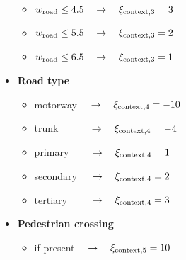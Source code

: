 \begin{itemize}
\begin{itemize}
                        \item $w_{\rm{road}}\leq4.5\quad\to\quad\xi_{\rm{context,3}}=3$
                        \item $w_{\rm{road}}\leq5.5\quad\to\quad\xi_{\rm{context,3}}=2$
                        \item $w_{\rm{road}}\leq6.5\quad\to\quad\xi_{\rm{context,3}}=1$
                    \end{itemize}
                \item \textbf{Road type}
                    \begin{itemize}
                        \item motorway $\quad\to\quad\xi_{\rm{context,4}}=-10$
                        \item trunk $\quad\qquad\to\quad\xi_{\rm{context,4}}=-4$
                        \item primary $\qquad\to\quad\xi_{\rm{context,4}}=1$
                        \item secondary $\,\quad\to\quad\xi_{\rm{context,4}}=2$
                        \item tertiary $\,\qquad\to\quad\xi_{\rm{context,4}}=3$
                    \end{itemize}
                \item \textbf{Pedestrian crossing}
                    \begin{itemize}
                        \item if present $\quad\to\quad\xi_{\rm{context,5}}=10$
                    \end{itemize}
            \end{itemize}

